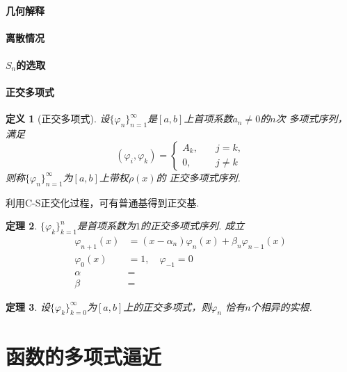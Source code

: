 \documentclass[12pt, a4paper]{article}
\theoremstyle{margin}
\newtheorem{thm}{定理}
\newtheorem{defi}[thm]{定义}
\begin{document}
  \paragraph{几何解释}

  \paragraph{离散情况}

  \paragraph{$S_n$的选取}

  \paragraph{正交多项式}
    \begin{defi}[正交多项式]
      设$\{\varphi_n\}_{n=1}^\infty$是$[a, b]$上首项系数$a_n\ne0$的$n$次
      多项式序列，满足
      \[
        (\varphi_i, \varphi_k) =
        \begin{cases}
          A_k,\quad & j = k,\\
          0,\quad   & j\ne k
        \end{cases}
      \]
      则称$\{\varphi_n\}_{n=1}^\infty$为$[a, b]$上带权$\rho(x)$的
      正交多项式序列.
    \end{defi}

  利用C-S正交化过程，可有普通基得到正交基.

  \begin{thm}
    $\{\varphi_k\}_{k=1}^n$是首项系数为$1$的正交多项式序列. 成立
    \[\begin{split}
      \varphi_{n+1}(x) &= (x-\alpha_n)\varphi_n(x) +
      \beta_n\varphi_{n-1}(x) \\
      \varphi_0(x) &= 1,\quad \varphi_{-1} = 0 \\
      \alpha & = \\
      \beta & =
    \end{split}\]
  \end{thm}

  \begin{thm}
    设$\{\varphi_k\}_{k=0}^\infty$为$[a, b]$上的正交多项式，则$\varphi_n$
    恰有$n$个相异的实根.
  \end{thm}

\newpage
\section{函数的多项式逼近}
\end{document}
